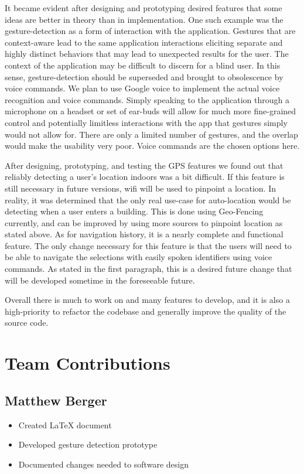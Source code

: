 \documentclass{scrreprt}
\begin{document}
It became evident after designing and prototyping desired features that some ideas are better in theory than in implementation. One such example was the gesture-detection as a form of interaction with the application. Gestures that are context-aware lead to the same application interactions eliciting separate and highly distinct behaviors that may lead to unexpected results for the user. The context of the application may be difficult to discern for a blind user. In this sense, gesture-detection should be superseded and brought to obsolescence by voice commands. We plan to use Google voice to implement the actual voice recognition and voice commands. Simply speaking to the application through a microphone on a headset or set of ear-buds will allow for much more fine-grained control and potentially limitless interactions with the app that gestures simply would not allow for. There are only a limited number of gestures, and the overlap would make the usability very poor. Voice commands are the chosen options here.

After designing, prototyping, and testing the GPS features we found out that reliably detecting a user's location indoors was a bit difficult. If this feature is still necessary in future versions, wifi will be used to pinpoint a location. In reality, it was determined that the only real use-case for auto-location would be detecting when a user enters a building. This is done using Geo-Fencing currently, and can be improved by using more sources to pinpoint location as stated above. As for navigation history, it is a nearly complete and functional feature. The only change necessary for this feature is that the users will need to be able to navigate the selections with easily spoken identifiers using voice commands. As stated in the first paragraph, this is a desired future change that will be developed sometime in the foreseeable future.

Overall there is much to work on and many features to develop, and it is also a high-priority to refactor the codebase and generally improve the quality of the source code.

\chapter{Team Contributions}
	\section{Matthew Berger}
		\begin{itemize}
			\item Created LaTeX document
			\item Developed gesture detection prototype
			\item Documented changes needed to software design
		\end{itemize}
\end{document}
